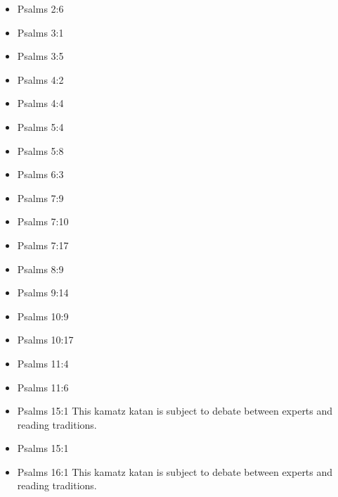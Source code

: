 \documentclass[14pt]{article}
\begin{document}
\begin{multicols}{2}
	\begin{itemize} \item Psalms 2:6
		
		\item Psalms 3:1

\item Psalms 3:5

\item Psalms 4:2

\item Psalms 4:4

\item Psalms 5:4

\item Psalms 5:8

\item Psalms 6:3

\item Psalms 7:9

\item Psalms 7:10

\item Psalms 7:17

\item Psalms 8:9

\item Psalms 9:14

\item Psalms 10:9

\item Psalms 10:17

\item Psalms 11:4

\item Psalms 11:6

\item Psalms 15:1 This kamatz katan is subject to debate between experts and reading traditions.

\item Psalms 15:1

\item Psalms 16:1 This kamatz katan is subject to debate between experts and reading traditions.


\end{itemize}
\end{multicols}
\end{document}
